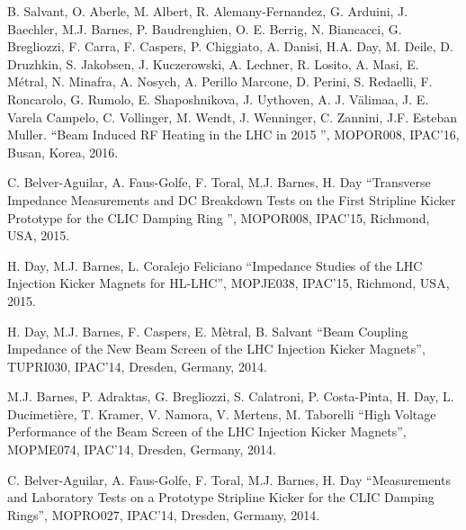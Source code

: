\documentclass[margin,line]{resume}
\begin{document}
\begin{resume}
\vspace{-2mm}

	 B. Salvant, O. Aberle, M. Albert, R. Alemany-Fernandez, G. Arduini, J. Baechler, M.J. Barnes, P. Baudrenghien, O. E. Berrig, N. Biancacci, G. Bregliozzi, F. Carra, F. Caspers, P. Chiggiato, A. Danisi, H.A. Day, M. Deile, D. Druzhkin, S. Jakobsen, J. Kuczerowski, A. Lechner, R. Losito, A. Masi, E. Métral, N. Minafra, A. Nosych, A. Perillo Marcone, D. Perini, S. Redaelli, F. Roncarolo, G. Rumolo, E. Shaposhnikova, J. Uythoven, A. J. Välimaa, J. E. Varela Campelo, C. Vollinger, M. Wendt, J. Wenninger, C. Zannini, J.F. Esteban Muller. 
    ``Beam Induced RF Heating in the LHC in 2015 '',
    MOPOR008, IPAC'16, Busan, Korea, 2016.

\vspace{-2mm}

	 C. Belver-Aguilar, A. Faus-Golfe, F. Toral, M.J. Barnes, H. Day
    ``Transverse Impedance Measurements and DC Breakdown Tests on the First Stripline Kicker Prototype for the CLIC Damping Ring '',
    MOPOR008, IPAC'15, Richmond, USA, 2015.

\vspace{-2mm}

	H. Day, M.J. Barnes, L. Coralejo Feliciano
    ``Impedance Studies of the LHC Injection Kicker Magnets for HL-LHC'',
    MOPJE038, IPAC'15, Richmond, USA, 2015.

\vspace{-2mm}

	H. Day, M.J. Barnes, F. Caspers, E. Mètral, B. Salvant
    ``Beam Coupling Impedance of the New Beam Screen of the LHC Injection Kicker Magnets'',
    TUPRI030, IPAC'14, Dresden, Germany, 2014.

\vspace{-2mm}

	M.J. Barnes, P. Adraktas, G. Bregliozzi, S. Calatroni, P. Costa-Pinta, H. Day, L. Ducimetière, T. Kramer, V. Namora, V. Mertens, M. Taborelli
    ``High Voltage Performance of the Beam Screen of the LHC Injection Kicker Magnets'',
    MOPME074, IPAC'14, Dresden, Germany, 2014.

\vspace{-2mm}

	 C. Belver-Aguilar, A. Faus-Golfe, F. Toral, M.J. Barnes, H. Day
    ``Measurements and Laboratory Tests on a Prototype Stripline Kicker for the CLIC Damping Rings'',
    MOPRO027, IPAC'14, Dresden, Germany, 2014.

\vspace{-2mm}


\end{resume}
\end{document}
